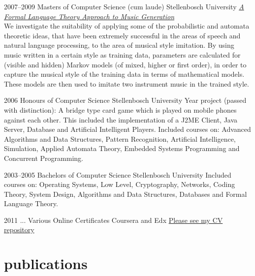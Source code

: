 \documentclass[print]{friggeri-cv} %
\begin{document}

\begin{entrylist}

\entry
{2007--2009}
{Masters {\normalfont of Computer Science} (cum laude)}
{Stellenbosch University}
{\href{http://superwillow.sourceforge.net/}{\emph{A Formal Language Theory Approach to Music Generation}} \\ We investigate the suitability of applying some of the probabilistic and automata theoretic ideas, that have been extremely successful in the areas of speech and natural language processing, to the area of musical style imitation. By using music written in a certain style as training data, parameters are calculated for (visible and hidden) Markov models (of mixed, higher or first order), in order to capture the musical style of the training data in terms of mathematical models. These models are then used to imitate two instrument music in the trained style.}

\entry
{2006}
{Honours {\normalfont of Computer Science}}
{Stellenbosch University}
{Year project (passed with distinction): A bridge type card game which is played on mobile phones against each other. This included the implementation of a J2ME Client, Java Server, Database and Artificial Intelligent Players.
Included courses on: Advanced Algorithms and Data Structures, Pattern Recognition, Artificial Intelligence, Simulation, Applied Automata Theory, Embedded Systems Programming and Concurrent Programming.}

\end{entrylist}

\begin{entrylist}

\entry
{2003--2005}
{Bachelors {\normalfont of Computer Science}}
{Stellenbosch University}
{Included courses on: Operating Systems, Low Level, Cryptography, Networks, Coding Theory, System Design, Algorithms and Data Structures, Databases and Formal Language Theory.}

\entry
{2011 ...}
{Various Online Certificates}
{Coursera and Edx}
{\href{https://github.com/awalterschulze/waltercv}{Please see my CV repository}}

\end{entrylist}

\section{publications}
\end{document}
